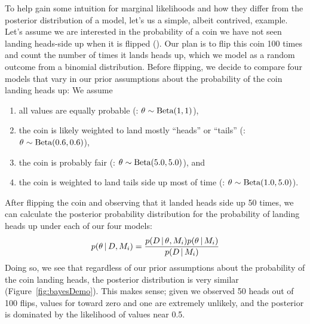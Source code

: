 To help gain some intuition for marginal likelihoods and how they differ from
the posterior distribution of a model, let's us a simple, albeit contrived,
example.
Let's assume we are interested in the probability of a coin we have not seen
landing heads-side up when it is flipped (\probheads).
Our plan is to flip this coin 100 times and count the number of times it lands
heads up, which we model as a random outcome from a binomial distribution.
Before flipping, we decide to compare four models that vary in our
prior assumptions about the probability of the coin landing heads up:
We assume
\begin{enumerate}
    \item all values are equally probable
        (\coinmodel[1]: $\theta_{} \sim \textrm{Beta}(1, 1)$),
    \item the coin is likely weighted to land mostly ``heads'' or ``tails''
        (\coinmodel[2]: $\theta_{} \sim \textrm{Beta}(0.6, 0.6)$),
    \item the coin is probably fair
        (\coinmodel[3]: $\theta_{} \sim \textrm{Beta}(5.0, 5.0)$), and
    \item the coin is weighted to land tails side up most of time
        (\coinmodel[4]: $\theta_{} \sim \textrm{Beta}(1.0, 5.0)$).
\end{enumerate}

\begin{linenomath}
After flipping the coin and observing that it landed heads side up 50 times,
we can calculate the posterior probability distribution for the probability
of landing heads up under each of our four models:
\begin{equation}
    p(\probheads \given \flipdata, \coinmodel[i]) = \frac{
        p(\flipdata \given \probheads, \coinmodel[i]) p(\probheads \given \coinmodel[i])
    }{
        p(\flipdata \given \coinmodel[i])
    }
    \label{eq:coinBayesRule}
\end{equation}
Doing so, we see that regardless of our prior assumptions about the
probability of the coin landing heads, the posterior distribution is
very similar (Figure~\ref{fig:bayesDemo}).
This makes sense; given we observed 50 heads out of 100 flips, values for
\probheads toward zero and one are extremely unlikely, and the posterior is
dominated by the likelihood of values near 0.5.
\end{linenomath}

